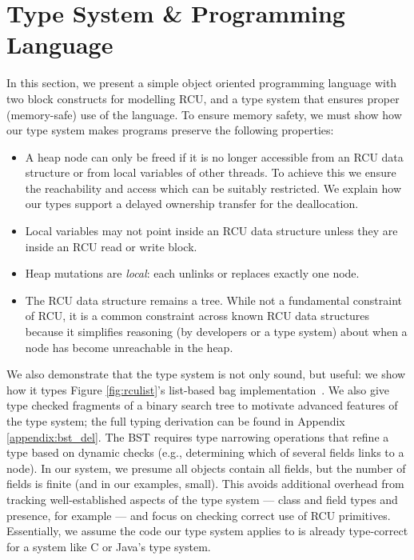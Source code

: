 \makeatletter %
\def\arcr{\@arraycr}
\makeatother
\section{Type System \& Programming Language}
\label{sec:tslbl}
In this section, we present a simple object oriented programming language with two block constructs for modelling \textsf{RCU}, and a type system that ensures proper (memory-safe) use of the language.
To ensure memory safety, we must show how our type system makes programs preserve the following properties:
\begin{itemize}
\item A heap node can only be freed if it is no longer accessible from an RCU data structure or from local variables of other threads. To achieve this we ensure the reachability and access which can be suitably restricted. We explain how our types support a delayed ownership transfer for the deallocation.
\item Local variables may not point inside an RCU data structure unless they are inside an \textsf{RCU} read or write block.
\item Heap mutations are \textit{local}: each unlinks or replaces exactly one node.
\item The RCU data structure remains a tree.  While not a fundamental constraint of RCU, it is a common constraint across known RCU data structures because it simplifies reasoning (by developers or a type system) about when a node has become unreachable in the heap.
\end{itemize}

We also demonstrate that the type system is not only sound, but useful:
we show how it types Figure \ref{fig:rculist}'s list-based bag implementation~\cite{McKenney2015SomeEO}.
We also give type checked fragments of a binary search tree to motivate advanced features of the type system; the full typing derivation can be found in Appendix \ref{appendix:bst_del}. The BST requires type narrowing operations that refine a type based on dynamic checks (e.g., determining which of several fields links to a node).
In our system, we presume all objects contain all fields, but the number of fields is finite (and in our examples, small). This avoids additional overhead from tracking well-established aspects of the type system --- class and field types and presence, for example --- and focus on checking correct use of RCU primitives.  Essentially, we assume the code our type system applies to is already type-correct for a system like C or Java's type system.
